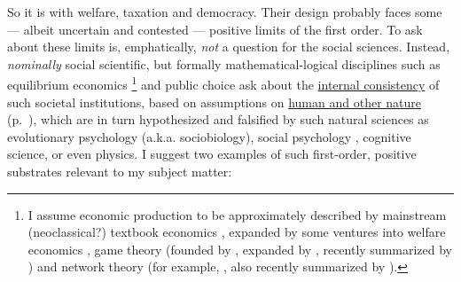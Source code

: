 So it is with welfare, taxation and democracy. 
Their design probably faces some --- albeit uncertain and contested --- positive limits of the first order. 
To ask about these limits is, emphatically, \emph{not} a question for the social sciences. 
Instead, \emph{nominally} social scientific, but formally mathematical-logical disciplines such as equilibrium economics
\footnote{
	I assume economic production to be approximately described by mainstream (neoclassical?) textbook economics \citep[including][]{Mankiw-2004-aa,FrankBernanke2004}, expanded by some ventures into welfare economics \citep{Hicks1939,Samuelson-1954-eu},  game theory (founded by \citealt{VonNeumannMorgenstern1944,Nash1951},  expanded by \citealt{Axelrod1981a}, recently summarized by \citealt{Kleinberg-2009-oz}) and network theory (for example, \citealt{Mandelbrot2004}, \citealt{Jackson1968} also recently summarized by \citealt{Kleinberg-2009-oz}).
}
and public choice ask about the \hyperref[itm:internal-consistency]{internal consistency} of such societal institutions, based on assumptions on \hyperref[itm:a-posteriori]{human and other nature} (p.~\pageref{itm:a-posteriori}), which are in turn hypothesized and falsified by such natural sciences as evolutionary psychology (a.k.a. sociobiology), social psychology \citep[initially][]{KahnemanTversky1979}, cognitive science, or even physics. 
I suggest two examples of such first-order, positive substrates relevant to my subject matter:
